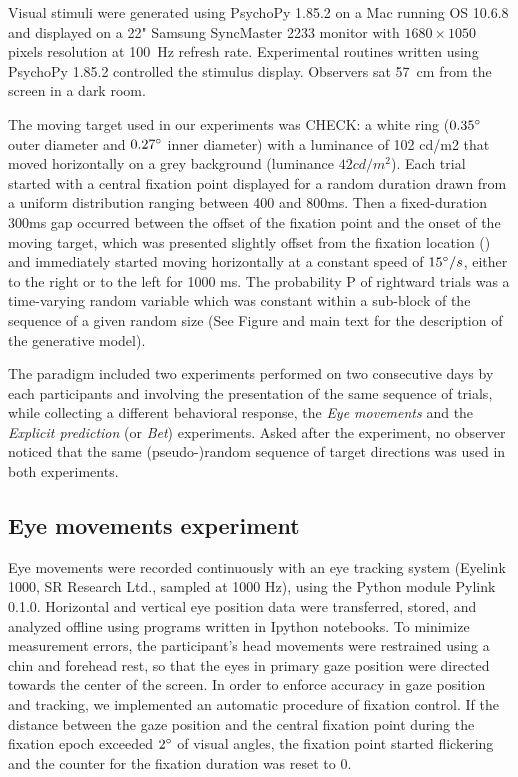 \documentclass[12pt,english]{article}%
\newcommand{\citet}[1]{\textcite{#1}}
\begin{document}
Visual stimuli were generated using PsychoPy 1.85.2 on a Mac running OS 10.6.8 and displayed on a 22" Samsung SyncMaster 2233 monitor with $1680\times 1050$ pixels resolution at 100~\si{\Hz} refresh rate. Experimental routines written using PsychoPy 1.85.2 controlled the stimulus display. Observers sat 57~\si{\cm} from the screen in a dark room.

The moving target used in our experiments was CHECK: a white ring ($0.35\degree$ outer diameter and $0.27\degree$ inner diameter) with a luminance of 102 cd/m2 that moved horizontally on a grey background (luminance $42cd/m^2$). Each trial started with a central fixation point displayed for a random duration drawn from a uniform distribution ranging between 400 and 800ms. Then a fixed-duration 300ms gap occurred between the offset of the fixation point and the onset of the moving target, which was presented slightly offset from the fixation location (\citet{Rashbass1961}) and immediately started moving horizontally at a constant speed of $15\degree/s$, either to the right or to the left for 1000 ms. The probability P of rightward trials was a time-varying random variable which was constant within a sub-block of the sequence of a given random size (See Figure  and main text for the description of the generative model).

The paradigm included two experiments performed on two consecutive days by each participants and involving the presentation of the same sequence of trials, while collecting a different behavioral response, the \textit{Eye movements} and the \textit{Explicit prediction} (or \textit{Bet}) experiments. Asked after the experiment, no observer noticed that the same (pseudo-)random sequence of target directions was used in both experiments.

\subsection{Eye movements experiment}
Eye movements were recorded continuously with an eye tracking system (Eyelink 1000, SR Research Ltd., sampled at 1000 Hz), using the Python module Pylink 0.1.0. Horizontal and vertical eye position data were transferred, stored, and analyzed offline using programs written in Ipython notebooks.
To minimize measurement errors, the participant's head movements were restrained using a chin and forehead rest, so that the eyes in primary gaze position were directed towards the center of the screen. In order to enforce accuracy in gaze position and tracking, we implemented an automatic procedure of fixation control. If the distance between the gaze position and the central fixation point during the fixation epoch exceeded $2\degree$ of visual angles, the fixation point started flickering and the counter for the fixation duration was reset to $0$.
\end{document}
